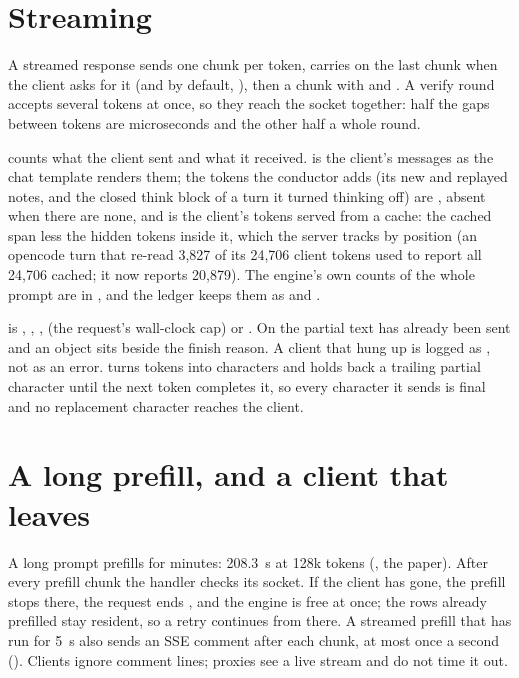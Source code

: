\section{Streaming}

A streamed response sends one chunk per token, carries  on the last chunk when the client asks for it (and by default, ), then a chunk with  and . A verify round accepts several tokens at once, so they reach the socket together: half the gaps between tokens are microseconds and the other half a whole round.

 counts what the client sent and what it received.  is the client's messages as the chat template renders them; the tokens the conductor adds (its new and replayed notes, and the closed think block of a turn it turned thinking off) are , absent when there are none, and  is the client's tokens served from a cache: the cached span less the hidden tokens inside it, which the server tracks by position (an opencode turn that re-read 3,827 of its 24,706 client tokens used to report all 24,706 cached; it now reports 20,879). The engine's own counts of the whole prompt are in , and the ledger keeps them as  and .

 is , , ,  (the request's wall-clock cap) or . On  the partial text has already been sent and an  object sits beside the finish reason. A client that hung up is logged as , not as an error.  turns tokens into characters and holds back a trailing partial character until the next token completes it, so every character it sends is final and no replacement character reaches the client.

\section{A long prefill, and a client that leaves}

A long prompt prefills for minutes: 208.3~s at 128k tokens (\measured, the paper). After every prefill chunk the handler checks its socket. If the client has gone, the prefill stops there, the request ends , and the engine is free at once; the rows already prefilled stay resident, so a retry continues from there. A streamed prefill that has run for 5~s also sends an SSE comment after each chunk, at most once a second (). Clients ignore comment lines; proxies see a live stream and do not time it out.


